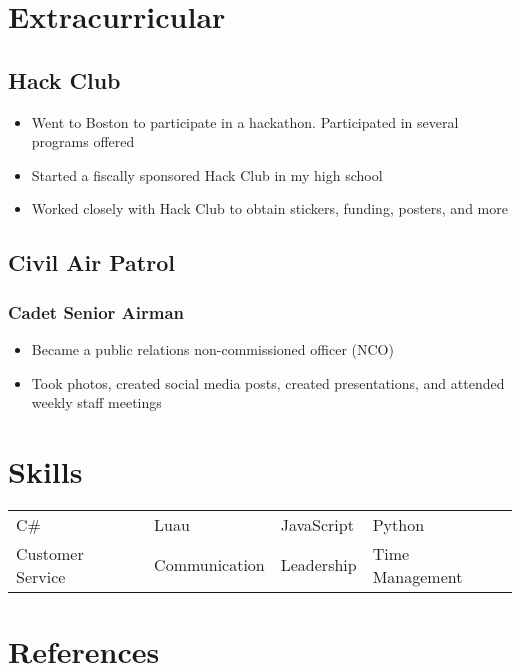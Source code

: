 \documentclass{my_cv}
\begin{document}

\section{Extracurricular}

\subsection{Hack Club}
\begin{itemize}
    \item Went to Boston to participate in a hackathon. Participated in several programs offered
    \item Started a fiscally sponsored Hack Club in my high school
    \item Worked closely with Hack Club to obtain stickers, funding, posters, and more
\end{itemize}

\subsection{Civil Air Patrol}
\subsubsection{Cadet Senior Airman}
\begin{itemize}
    \item Became a public relations non-commissioned officer (NCO)
    \item Took photos, created social media posts, created presentations, and attended weekly staff meetings
\end{itemize}

\section{Skills}
\begin{tabular}{l l l l}
    C\# & Luau & JavaScript & Python \\
    Customer Service & Communication & Leadership & Time Management
\end{tabular}

\section{References}
\end{document}
